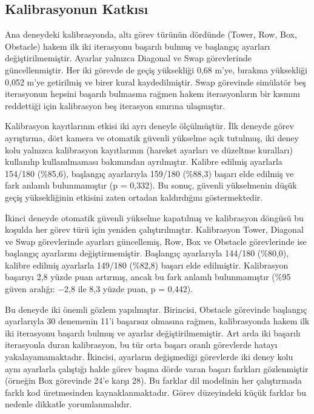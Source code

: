\documentclass[preprint,12pt]{elsarticle}
\begin{document}
\hypertarget{kalibrasyonun-katkux131sux131}{%
\subsection{Kalibrasyonun Katkısı}\label{kalibrasyonun-katkux131sux131}}

Ana deneydeki kalibrasyonda, altı görev türünün dördünde (Tower, Row, Box, Obstacle) hakem ilk iki iterasyonu başarılı bulmuş ve başlangıç ayarları değiştirilmemiştir. Ayarlar yalnızca Diagonal ve Swap görevlerinde güncellenmiştir. Her iki görevde de geçiş yüksekliği 0,68 m'ye, bırakma yüksekliği 0,052 m'ye getirilmiş ve birer kural kaydedilmiştir. Swap görevinde simülatör beş iterasyonun hepsini başarılı bulmasına rağmen hakem iterasyonların bir kısmını reddettiği için kalibrasyon beş iterasyon sınırına ulaşmıştır.

Kalibrasyon kayıtlarının etkisi iki ayrı deneyle ölçülmüştür. İlk deneyde görev ayrıştırma, dört kamera ve otomatik güvenli yükselme açık tutulmuş, iki deney kolu yalnızca kalibrasyon kayıtlarının (hareket ayarları ve düzeltme kuralları) kullanılıp kullanılmaması bakımından ayrılmıştır. Kalibre edilmiş ayarlarla 154/180 (\%85,6), başlangıç ayarlarıyla 159/180 (\%88,3) başarı elde edilmiş ve fark anlamlı bulunmamıştır (p = 0,332). Bu sonuç, güvenli yükselmenin düşük geçiş yüksekliğinin etkisini zaten ortadan kaldırdığını göstermektedir.

İkinci deneyde otomatik güvenli yükselme kapatılmış ve kalibrasyon döngüsü bu koşulda her görev türü için yeniden çalıştırılmıştır. Kalibrasyon Tower, Diagonal ve Swap görevlerinde ayarları güncellemiş, Row, Box ve Obstacle görevlerinde ise başlangıç ayarlarını değiştirmemiştir. Başlangıç ayarlarıyla 144/180 (\%80,0), kalibre edilmiş ayarlarla 149/180 (\%82,8) başarı elde edilmiştir. Kalibrasyon başarıyı 2,8 yüzde puan artırmış, ancak bu fark anlamlı bulunmamıştır (\%95 güven aralığı: $-$2,8 ile 8,3 yüzde puan, p = 0,442).

Bu deneyde iki önemli gözlem yapılmıştır. Birincisi, Obstacle görevinde başlangıç ayarlarıyla 30 denemenin 11'i başarısız olmasına rağmen, kalibrasyonda hakem ilk iki iterasyonu başarılı bulmuş ve ayarlar değiştirilmemiştir. Art arda iki başarılı iterasyonla duran kalibrasyon, bu tür orta başarı oranlı görevlerde hatayı yakalayamamaktadır. İkincisi, ayarların değişmediği görevlerde iki deney kolu aynı ayarlarla çalıştığı halde görev başına dörde varan başarı farkları gözlenmiştir (örneğin Box görevinde 24'e karşı 28). Bu farklar dil modelinin her çalıştırmada farklı kod üretmesinden kaynaklanmaktadır. Görev düzeyindeki küçük farklar bu nedenle dikkatle yorumlanmalıdır.
\end{document}

